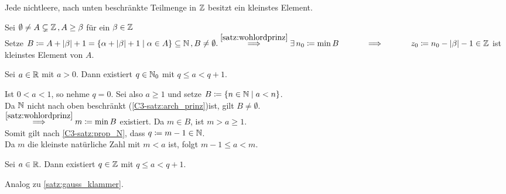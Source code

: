 \documentclass[../ana1.tex]{subfiles}
\begin{document}
\begin{kor}
	Jede nichtleere, nach unten beschränkte Teilmenge in \(\mathbb{Z} \) besitzt ein kleinstes Element.
\end{kor}
\begin{bew}
	Sei \(\emptyset \neq A \subsetneq \mathbb{Z} \operatorname{,} A \geq \beta \) für ein \( \beta \in\mathbb{Z} \) \\
	Setze \(B \coloneqq A + \abs{\beta} + 1 = \set{\alpha + \abs{\beta} + 1 \; \vert \; \alpha \in A} \subseteq \N \ko B \neq \emptyset. \\
	\overset{\autoref{satz:wohlordprinz}}{\implies} \exists \, n_0 \coloneqq \min B\\
	\overset{\phantom{\autoref{satz:wohlordprinz}}}{\implies} z_0 \coloneqq n_0 - \abs{\beta} - 1 \in \Z \) ist kleinstes Element von \(A \).
\end{bew}

\begin{lem}\label{satz:gauss_klammer}
	Sei \( a \in\mathbb{R} \) mit \( a > 0 \). Dann existiert \(q \in \mathbb{N}_0 \) mit \(q \leq a < q + 1 \).
\end{lem}
\begin{bew}
	Ist \( 0 < a < 1 \), so nehme \( q = 0 \). Sei also \(a \geq 1 \) und setze \(B \coloneqq \{ n \in \mathbb{N} \; \vert \; a < n \} \). \\
	Da \( \mathbb{N} \) nicht nach oben beschränkt (\autoref{C3-satz:arch_prinz})ist, gilt \(B \neq \emptyset \). \\
	\(\overset{\autoref{satz:wohlordprinz}}{\implies} m \coloneqq \min B \) existiert. Da \(m \in B \), ist \(m > a \geq 1 \). \\
	Somit gilt nach \autoref{C3-satz:prop_N}, dass \(q\coloneqq m-1\in\mathbb{N} \).\\
	Da \( m \) die kleinste natürliche Zahl mit \(m < a \) ist, folgt \(m - 1 \leq a < m \).
\end{bew}

\begin{bem}
	Sei \(a \in \mathbb{R} \). Dann existiert \(q \in \mathbb{Z} \) mit \(q \leq a < q + 1 \).
\end{bem}
\begin{bew}
	Analog zu \autoref{satz:gauss_klammer}.
\end{bew}
\end{document}
